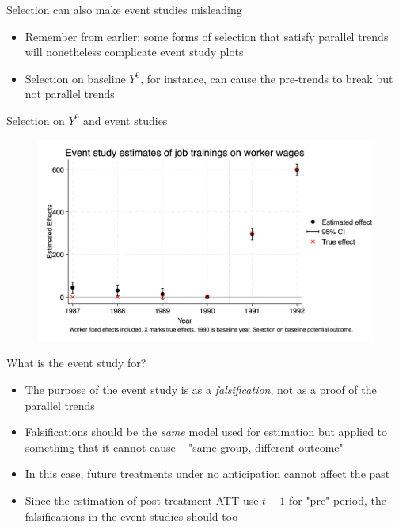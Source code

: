 \documentclass{beamer}
\begin{document}
\begin{frame}{Selection can also make event studies misleading}

\begin{itemize}

\item Remember from earlier: some forms of selection that satisfy parallel trends will nonetheless complicate event study plots
\item Selection on baseline $Y^0$, for instance, can cause the pre-trends to break but not parallel trends
\end{itemize}

\end{frame}

\begin{frame}{Selection on $Y^0$ and event studies}

\begin{figure}
    \centering
    \includegraphics[height=0.70\textheight]{./lecture_includes/selection_y0.png}
\end{figure}

\end{frame}










\begin{frame}{What is the event study for?}

\begin{itemize}

\item The purpose of the event study is as a \emph{falsification}, not as a proof of the parallel trends
\item Falsifications should be the \emph{same} model used for estimation but applied to something that it cannot cause -- "same group, different outcome"
\item In this case, future treatments under no anticipation cannot affect the past
\item Since the estimation of post-treatment ATT use $t-1$ for "pre" period, the falsifications in the event studies should too 
\end{itemize}

\end{frame}
\end{document}
